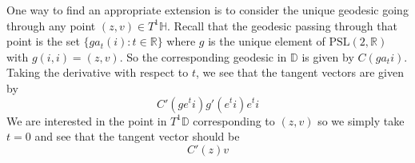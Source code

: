 \documentclass[]{article}
\begin{document}
One way to find an appropriate extension is to consider the unique geodesic going through any point $(z, v) \in T^1\mathbb{H}$.
Recall that the geodesic passing through that point is the set $\{ga_t(i): t\in \mathbb{R}\}$ where $g$ is the unique element of $\text{PSL}(2, \mathbb{R})$ with $g(i, i) = (z, v)$.
So the corresponding geodesic in $\mathbb{D}$ is given by $C(ga_ti)$.
Taking the derivative with respect to $t$, we see that the tangent vectors are given by
$$
C'(ge^ti)g'(e^ti)e^ti
$$
We are interested in the point in $T^1\mathbb{D}$ corresponding to $(z, v)$ so we simply take $t = 0$ and see that the tangent vector should be
$$
C'(z)v
$$
\end{document}
